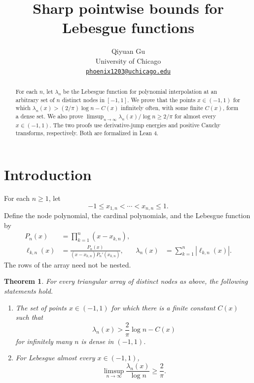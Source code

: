\documentclass[11pt]{article}
\title{Sharp pointwise bounds for Lebesgue functions}
\author{Qiyuan Gu\\
University of Chicago\\
\href{mailto:phoenix1203@uchicago.edu}{\texttt{phoenix1203@uchicago.edu}}}
\date{}
\newtheorem{theorem}{Theorem}
\theoremstyle{remark}
\numberwithin{equation}{section}
\begin{document}
\maketitle

\begin{abstract}
For each \(n\), let \(\lambda_n\) be the Lebesgue function for
polynomial interpolation at an arbitrary set of \(n\) distinct nodes
in \([-1,1]\). We prove that the points \(x\in(-1,1)\) for which
\(\lambda_n(x)>(2/\pi)\log n-C(x)\) infinitely often, with
some finite \(C(x)\), form a dense set. We also prove
\(\limsup_{n\to\infty}\lambda_n(x)/\log n\ge2/\pi\)
for almost every \(x\in(-1,1)\).
The two proofs use derivative-jump energies and positive Cauchy
transforms, respectively. Both are formalized in Lean 4.
\end{abstract}

\section{Introduction}

For each \(n\ge1\), let
\[
 -1\le x_{1,n}<\cdots<x_{n,n}\le1.
\]
Define the node polynomial, the cardinal polynomials, and the Lebesgue
function by
\begin{align*}
 P_n(x)&=\prod_{k=1}^n(x-x_{k,n}),\\
 \ell_{k,n}(x)&=\frac{P_n(x)}{(x-x_{k,n})P_n'(x_{k,n})},
 &\lambda_n(x)&=\sum_{k=1}^n|\ell_{k,n}(x)|.
\end{align*}
The rows of the array need not be nested.

\begin{theorem}\label{thm:main}
For every triangular array of distinct nodes as above, the following
statements hold.
\begin{enumerate}
\item[(i)] The set of points \(x\in(-1,1)\) for which there is a finite
constant \(C(x)\) such that
\begin{equation}\label{eq:main-fixed}
 \lambda_n(x)>\frac2\pi\log n-C(x)
\end{equation}
for infinitely many \(n\) is dense in \((-1,1)\).
\item[(ii)] For Lebesgue almost every \(x\in(-1,1)\),
\begin{equation}\label{eq:main-ae}
 \limsup_{n\to\infty}\frac{\lambda_n(x)}{\log n}\ge\frac2\pi.
\end{equation}
\end{enumerate}
\end{theorem}
\end{document}
